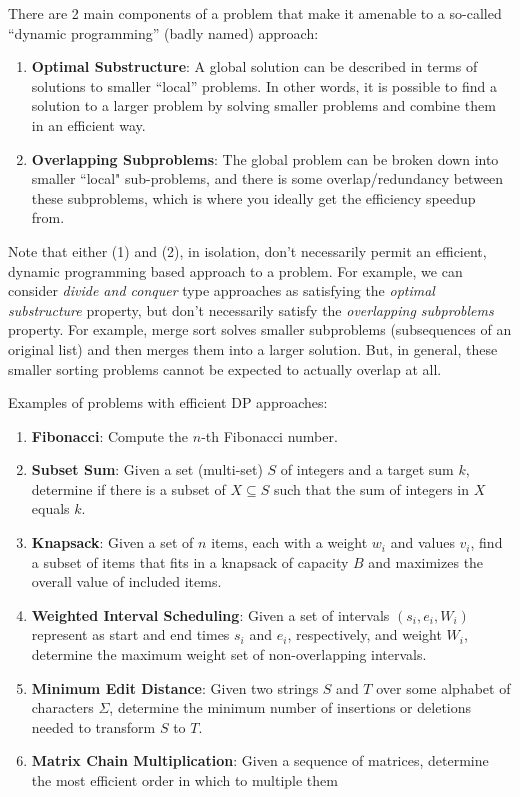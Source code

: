 \documentclass[10pt,a4paper]{article}
\begin{document}
There are 2 main components of a problem that make it amenable to a so-called ``dynamic programming'' (badly named) approach:
\begin{enumerate}
    \item \textbf{Optimal Substructure}: A global solution can be described in terms of solutions to smaller ``local'' problems. In other words, it is possible to find a solution to a larger problem by solving smaller problems and combine them in an efficient way. 
    \item \textbf{Overlapping Subproblems}: The global problem can be broken down into smaller ``local" sub-problems, and there is some overlap/redundancy between these subproblems, which is where you ideally get the efficiency speedup from.
\end{enumerate}
Note that either (1) and (2), in isolation, don't necessarily permit an efficient, dynamic programming based approach to a problem. For example, we can consider \textit{divide and conquer} type approaches as satisfying the \textit{optimal substructure} property, but don't necessarily satisfy the \textit{overlapping subproblems} property. For example, merge sort solves smaller subproblems (subsequences of an original list) and then merges them into a larger solution. But, in general, these smaller sorting problems cannot be expected to actually overlap at all.

Examples of problems with efficient DP approaches:
\begin{enumerate}
    \item \textbf{Fibonacci}: Compute the $n$-th Fibonacci number.
    \item \textbf{Subset Sum}: Given a set (multi-set) $S$ of integers and a target sum $k$, determine if there is a subset of $X \subseteq S$ such that the sum of integers in $X$ equals $k$.
    \item \textbf{Knapsack}: Given a set of $n$ items, each with a weight $w_i$ and values $v_i$, find a subset of items that fits in a knapsack of capacity $B$ and maximizes the overall value of included items.
    \item \textbf{Weighted Interval Scheduling}: Given a set of intervals $(s_i,e_i, W_i)$ represent as start and end times $s_i$ and $e_i$, respectively, and weight $W_i$, determine the maximum weight set of non-overlapping intervals.
    \item \textbf{Minimum Edit Distance}: Given two strings $S$ and $T$ over some alphabet of characters $\Sigma$, determine the minimum number of insertions or deletions needed to transform $S$ to $T$.
    \item \textbf{Matrix Chain Multiplication}: Given a sequence of matrices, determine the most efficient order in which to multiple them
\end{enumerate}
\end{document}
